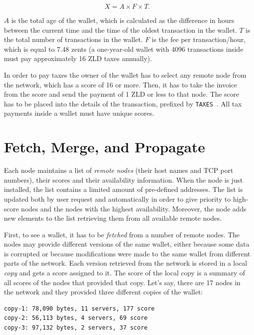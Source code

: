 \documentclass[11pt,oneside]{article}
\newcommand\dd[1]{\colorbox{gray!30}{\texttt{#1}}}
\begin{document}
$$X = A \times F \times T.$$

$A$ is the total age of the wallet,
which is calculated as the difference in hours between the current time
and the time of the oldest transaction in the wallet.
$T$ is the total number of transactions in the wallet.
$F$ is the fee per transaction/hour, which is equal to 7.48 zents
(a one-year-old wallet with 4096 transactions inside must pay approximately 16 ZLD taxes annually).

In order to pay taxes the owner of the wallet has to select any remote
node from the network, which has a score of 16 or more. Then, it has to
take the invoice from the score and send the payment of 1 ZLD or less
to that node. The score has to be placed into the details of the transaction,
prefixed by \dd{TAXES }. All tax payments inside a wallet must
have unique scores.

\section{Fetch, Merge, and Propagate}

Each node maintains a list of \emph{remote nodes} (their host names and TCP port numbers),
their scores and their availability information. When the node is just installed,
the list contains a limited amount of pre-defined addresses. The list is
updated both by user request and automatically in order to give priority
to high-score nodes and the nodes with the highest availability.
Moreover, the node adds new elements to the list retrieving them from all
available remote nodes.

First, to see a wallet, it has to be \emph{fetched} from a number of remote
nodes. The nodes may provide different versions of the same wallet, either
because some data is corrupted or because modifications were made to the same
wallet from different parts of the network. Each version retrieved from the
network is stored in a local \emph{copy} and gets a score assigned to it.
The score of the local copy is a summary of all scores of the nodes that
provided that copy. Let's say, there are 17 nodes in the network and they
provided three different copies of the wallet:

\begin{verbatim}
copy-1: 78,090 bytes, 11 servers, 177 score
copy-2: 56,113 bytes, 4 servers, 69 score
copy-3: 97,132 bytes, 2 servers, 37 score
\end{verbatim}
\end{document}
